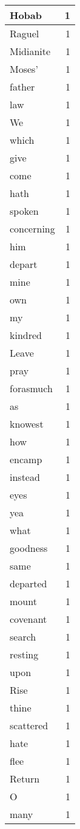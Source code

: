 \begin{center}
\begin{longtable}{l|r}
Hobab & 1 \\ \hline
Raguel & 1 \\ \hline
Midianite & 1 \\ \hline
Moses' & 1 \\ \hline
father & 1 \\ \hline
law & 1 \\ \hline
We & 1 \\ \hline
which & 1 \\ \hline
give & 1 \\ \hline
come & 1 \\ \hline
hath & 1 \\ \hline
spoken & 1 \\ \hline
concerning & 1 \\ \hline
him & 1 \\ \hline
depart & 1 \\ \hline
mine & 1 \\ \hline
own & 1 \\ \hline
my & 1 \\ \hline
kindred & 1 \\ \hline
Leave & 1 \\ \hline
pray & 1 \\ \hline
forasmuch & 1 \\ \hline
as & 1 \\ \hline
knowest & 1 \\ \hline
how & 1 \\ \hline
encamp & 1 \\ \hline
instead & 1 \\ \hline
eyes & 1 \\ \hline
yea & 1 \\ \hline
what & 1 \\ \hline
goodness & 1 \\ \hline
same & 1 \\ \hline
departed & 1 \\ \hline
mount & 1 \\ \hline
covenant & 1 \\ \hline
search & 1 \\ \hline
resting & 1 \\ \hline
upon & 1 \\ \hline
Rise & 1 \\ \hline
thine & 1 \\ \hline
scattered & 1 \\ \hline
hate & 1 \\ \hline
flee & 1 \\ \hline
Return & 1 \\ \hline
O & 1 \\ \hline
many & 1 \\ \hline
\end{longtable}
\end{center}



